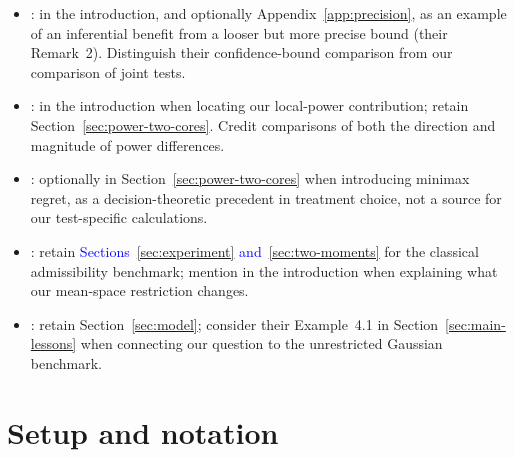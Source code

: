\documentclass[11pt]{article}
\newcommand{\rev}[1]{\textcolor{blue}{#1}}
\numberwithin{equation}{section}
\theoremstyle{definition}
\begin{document}
{\begin{itemize}
\item \citet{ponomarev/semenova:25}: in the introduction, and optionally
Appendix~\ref{app:precision}, as an example of an inferential benefit
from a looser but more precise bound (their Remark~2). Distinguish
their confidence-bound comparison from our comparison of joint tests.

\item \citet{ponomarev:22}: in the introduction when locating our
local-power contribution; retain Section~\ref{sec:power-two-cores}.
Credit comparisons of both the direction and magnitude of power
differences.

\item \citet{manski:04}: optionally in
Section~\ref{sec:power-two-cores} when introducing minimax regret,
as a decision-theoretic precedent in treatment choice, not a source
for our test-specific calculations.

\item \citet{lehmann/romano:05}: retain
\rev{Sections~\ref{sec:experiment} and~\ref{sec:two-moments}} for the
classical admissibility benchmark; mention in the introduction when
explaining what our mean-space restriction changes.

\item \citet{canay/shaikh:2017}: retain Section~\ref{sec:model};
consider their Example~4.1 in Section~\ref{sec:main-lessons} when
connecting our question to the unrestricted Gaussian benchmark.

\end{itemize}
}

\section{Setup and notation}\label{sec:setup}\label{sec:model}
\end{document}
